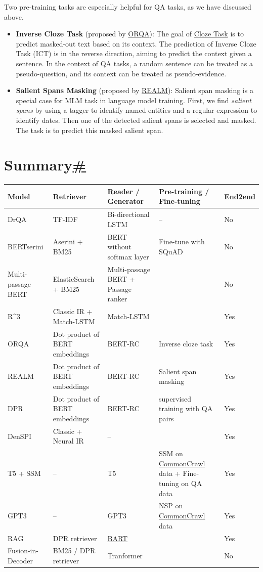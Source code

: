 Two pre-training tasks are especially helpful for QA tasks, as we have discussed above.

\begin{itemize}
\item
  \textbf{Inverse Cloze Task} (proposed by \hyperref[ORQA]{ORQA}): The goal of \href{https://en.wikipedia.org/wiki/Cloze_test}{Cloze Task} is to predict masked-out text based on its context. The prediction of Inverse Cloze Task (ICT) is in the reverse direction, aiming to predict the context given a sentence. In the context of QA tasks, a random sentence can be treated as a pseudo-question, and its context can be treated as pseudo-evidence.
\item
  \textbf{Salient Spans Masking} (proposed by \hyperref[REALM]{REALM}): Salient span masking is a special case for MLM task in language model training. First, we find \emph{salient spans} by using a tagger to identify named entities and a regular expression to identify dates. Then one of the detected salient spans is selected and masked. The task is to predict this masked salient span.
\end{itemize}

\section{\texorpdfstring{Summary\hyperref[summary]{\#}}{Summary\#}}\label{summary}

\begin{longtable}[]{@{}lllll@{}}
\toprule\noalign{}
Model & Retriever & Reader / Generator & Pre-training / Fine-tuning & End2end \\
\midrule\noalign{}
\endhead
\bottomrule\noalign{}
\endlastfoot
DrQA & TF-IDF & Bi-directional LSTM & -- & No \\
BERTserini & Aserini + BM25 & BERT without softmax layer & Fine-tune with SQuAD & No \\
Multi-passage BERT & ElasticSearch + BM25 & Multi-passage BERT + Passage ranker & & No \\
R\^{}3 & Classic IR + Match-LSTM & Match-LSTM & & Yes \\
ORQA & Dot product of BERT embeddings & BERT-RC & Inverse cloze task & Yes \\
REALM & Dot product of BERT embeddings & BERT-RC & Salient span masking & Yes \\
DPR & Dot product of BERT embeddings & BERT-RC & supervised training with QA pairs & Yes \\
DenSPI & Classic + Neural IR & -- & & Yes \\
T5 + SSM & -- & T5 & SSM on \href{https://commoncrawl.org/the-data/get-started/}{CommonCrawl} data + Fine-tuning on QA data & Yes \\
GPT3 & -- & GPT3 & NSP on \href{https://commoncrawl.org/the-data/get-started/}{CommonCrawl} data & Yes \\
RAG & DPR retriever & \href{https://arxiv.org/abs/1910.13461}{BART} & & Yes \\
Fusion-in-Decoder & BM25 / DPR retriever & Tranformer & & No \\
\end{longtable}

